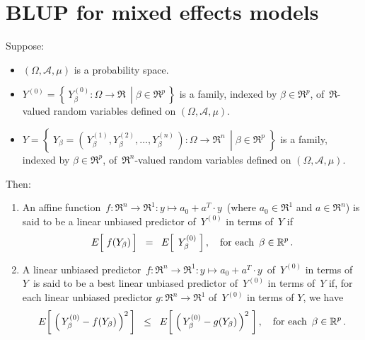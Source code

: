 

\section{BLUP for mixed effects models}
\setcounter{theorem}{0}
\setcounter{equation}{0}

\renewcommand{\theenumi}{\roman{enumi}}
\renewcommand{\labelenumi}{\textnormal{(\theenumi)}$\;\;$}


\begin{definition}
\mbox{}
\vskip 0.1cm
\noindent
Suppose:
\begin{itemize}
\item
	$(\Omega,\mathcal{A},\mu)$ is a probability space.
\item
	$Y^{(0)} = \left\{\,\left.Y^{(0)}_{\beta} : \Omega \longrightarrow \Re\,\;\right\vert\;\beta\in\Re^{p}\,\right\}$
	is a family, indexed by $\beta \in \Re^{p}$, of \,$\Re$-valued random variables
	defined on $(\Omega,\mathcal{A},\mu)$.
\item
	$Y = \left\{\;Y_{\beta} = \left.(\,Y^{(1)}_{\beta}, Y^{(2)}_{\beta}, \ldots, Y^{(n)}_{\beta}\,)
	: \Omega \longrightarrow \Re^{n}\,\;\right\vert\; \beta \in \Re^{p} \;\right\}$
	is a family, indexed by $\beta \in \Re^{p}$, of \,$\Re^{n}$-valued random variables
	defined on $(\Omega,\mathcal{A},\mu)$.
\end{itemize}
Then:
\begin{enumerate}
\item
	An affine function
	\,$f : \Re^{n} \longrightarrow \Re^{1} : y \longmapsto a_{0} + a^{T} \cdot y$\,
	(where $a_{0} \in \Re^{1}$ and $a \in \Re^{n}$) is said to be a
	{\color{red}linear unbiased predictor of \,$Y^{(0)}$ in terms of \,$Y$} if
	\begin{equation*}
	E\!\left[\;\overset{{\color{white}.}}{f}(Y_{\beta})\,\right]
	\;\; = \;\;
		E\!\left[\;\,Y^{(0)}_{\beta}\;\right],
	\quad
	\textnormal{for each \,$\beta \in \Re^{p}$}\,.
	\end{equation*}
\item
	A linear unbiased predictor
	\,$f : \Re^{n} \longrightarrow \Re^{1} : y \longmapsto a_{0} + a^{T} \cdot y$\,
	of \,$Y^{(0)}$ in terms of \,$Y$\, is said to be a
	{\color{red}best linear unbiased predictor of \,$Y^{(0)}$ in terms of \,$Y$} if,
	for each linear unbiased predictor $g : \Re^{n} \longrightarrow \Re^{1}$
	of \,$Y^{(0)}$ in terms of $Y$, we have
	\begin{equation*}
	E\!\left[\; \left(\,Y^{(0)}_{\beta } - \overset{{\color{white}.}}{f}(Y_{\beta})\,\right)^{2}\,\right]
	\;\; \leq \;\;
		E\!\left[\;\left(\,Y^{(0)}_{\beta } - \overset{{\color{white}.}}{g}(Y_{\beta})\,\right)^{2}\;\right],
	\quad
	\textnormal{for each \,$\beta \in \Re^{p}$}\,.
	\end{equation*}
\end{enumerate}
\end{definition}


